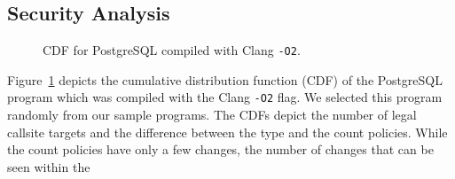\subsection{Security Analysis}
\label{RQ5: Security Analysis}
\textit{}

\begin{figure}[h] 
\vspace{-.6cm}
  \begin{minipage}[b]{1.0\linewidth}
    \centering
    \resizebox{.9\columnwidth}{!}{}
    \vspace{-.4cm}
    \caption{CDF for PostgreSQL compiled with Clang \texttt{-O2}.} 
    \label{fig7} 
    \vspace{1ex}
  \end{minipage}%
\vspace{-.3cm}
\end{figure}
Figure~\ref{fig7}
depicts the cumulative distribution function (CDF) of the PostgreSQL program which was compiled with the Clang \texttt{-O2} flag. 
We selected this program randomly from our sample programs. 
The CDFs depict the number of legal callsite targets and the difference between the type and the count policies. 
While the count  policies have only a few changes, the number of changes that can be seen within the 
